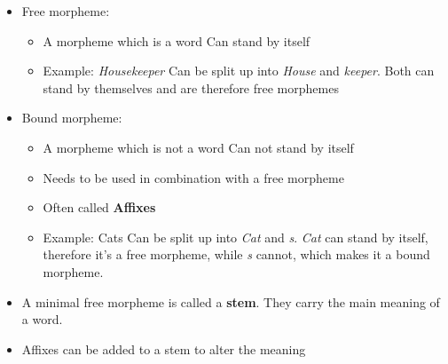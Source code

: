 \documentclass[
../../NLP4W_Summary.tex,
]
{subfiles}
\begin{document}
\begin{defbox}
    \begin{itemize}
        \item Free morpheme:
        \begin{itemize}
            \item A morpheme which is a word \rightarrow Can stand by itself
            \item Example: \textit{Housekeeper} \rightarrow Can be split up into \textit{House} and \textit{keeper}. Both can stand by themselves and are therefore free morphemes
        \end{itemize}
        \item Bound morpheme:
        \begin{itemize}
            \item A morpheme which is not a word \rightarrow Can not stand by itself
            \item Needs to be used in combination with a free morpheme
            \item Often called \textbf{Affixes}
            \item Example: Cats \rightarrow Can be split up into \textit{Cat} and \textit{s}. \textit{Cat} can stand by itself, therefore it's a free morpheme, while \textit{s} cannot, which makes it a bound morpheme.
        \end{itemize}
        \item A minimal free morpheme is called a \textbf{stem}. They carry the main meaning of a word.
        \item Affixes can be added to a stem to alter the meaning
    \end{itemize}
\end{defbox}
\end{document}
